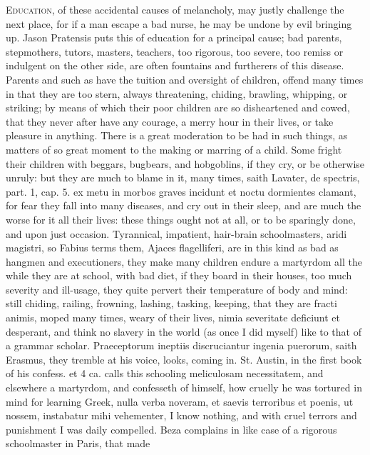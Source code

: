 {\lettrine{E}{ducation}, of these accidental causes of melancholy, may justly
challenge the next place, for if a man escape a bad nurse, he may be
undone by evil bringing up. Jason Pratensis puts this of
education for a principal cause; bad parents, stepmothers, tutors,
masters, teachers, too rigorous, too severe, too remiss or indulgent on
the other side, are often fountains and furtherers of this disease.
Parents and such as have the tuition and oversight of children, offend
many times in that they are too stern, always threatening, chiding,
brawling, whipping, or striking; by means of which their poor children
are so disheartened and cowed, that they never after have any courage,
a merry hour in their lives, or take pleasure in anything. There is a
great moderation to be had in such things, as matters of so great
moment to the making or marring of a child. Some fright their children
with beggars, bugbears, and hobgoblins, if they cry, or be otherwise
unruly: but they are much to blame in it, many times, saith Lavater, de
spectris, part. 1, cap. 5. ex metu in morbos graves incidunt et noctu
dormientes clamant, for fear they fall into many diseases, and cry out
in their sleep, and are much the worse for it all their lives: these
things ought not at all, or to be sparingly done, and upon just
occasion. Tyrannical, impatient, hair-brain schoolmasters, aridi
magistri, so Fabius terms them, Ajaces flagelliferi, are in this
kind as bad as hangmen and executioners, they make many children endure
a martyrdom all the while they are at school, with bad diet, if they
board in their houses, too much severity and ill-usage, they quite
pervert their temperature of body and mind: still chiding, railing,
frowning, lashing, tasking, keeping, that they are fracti animis, moped
many times, weary of their lives, nimia severitate deficiunt et
desperant, and think no slavery in the world (as once I did myself)
like to that of a grammar scholar. Praeceptorum ineptiis discruciantur
ingenia puerorum,  saith Erasmus, they tremble at his voice,
looks, coming in. St. Austin, in the first book of his confess. et 4
ca. calls this schooling meliculosam necessitatem, and elsewhere a
martyrdom, and confesseth of himself, how cruelly he was tortured in
mind for learning Greek, \textlatin{nulla verba noveram, et saevis terroribus et
poenis, ut nossem, instabatur mihi vehementer}, I know nothing, and with
cruel terrors and punishment I was daily compelled. Beza
complains in like case of a rigorous schoolmaster in Paris, that made
}
